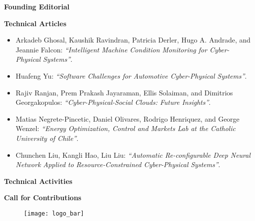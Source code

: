 {
\setlength{\parskip}{.2in}

\textbf{Founding Editorial}

\textbf{Technical Articles}
\vspace{-.2in}
\begin{itemize}
    \item Arkadeb Ghosal, Kaushik Ravindran, Patricia Derler, Hugo A. Andrade, and Jeannie Falcon:
    \textit{``Intelligent Machine Condition Monitoring for Cyber-Physical Systems''}.
    \item Huafeng Yu:
    \textit{``Software Challenges for Automotive Cyber-Physical Systems''}.
    \item Rajiv Ranjan, Prem Prakash Jayaraman, Ellis Solaiman, and Dimitrios Georgakopulos:
    \textit{``Cyber-Physical-Social Clouds: Future Insights''}.
    \item Matias Negrete-Pincetic, Daniel Olivares, Rodrigo Henriquez, and George Wenzel:
    \textit{``Energy Optimization, Control and Markets Lab at the Catholic University of Chile''}.
    \item Chunchen Liu, Kangli Hao, Liu Liu:
    \textit{``Automatic Re-configurable Deep Neural Network Applied to Resource-Constrained Cyber-Physical Systems''}.
\end{itemize}

\textbf{Technical Activities}

\textbf{Call for Contributions}

}


\begin{figure}[b!]
  \centering
  \texttt{[image: logo\_bar]}
  \caption*{}
\end{figure}


